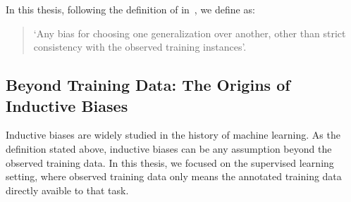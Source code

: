 
In this thesis, following the definition of 
in~\cite{mitchell1980need}, we define  as:

\begin{quote}
  \label{def:bias}
  `Any bias for choosing one generalization over another, other than
  strict consistency with the observed training instances'.
\end{quote}

\subsection{Beyond Training Data: The Origins of Inductive Biases}
\label{ssec:intro:bias-source}
Inductive biases are widely studied in the history of machine
learning. As the definition stated above, inductive biases can be any
assumption beyond the observed training data. In this thesis, we
focused on the supervised learning setting, where observed training
data only means the annotated training data directly avaible to that
task.


